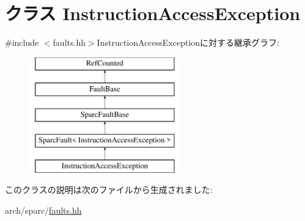 \hypertarget{classSparcISA_1_1InstructionAccessException}{
\section{クラス InstructionAccessException}
\label{classSparcISA_1_1InstructionAccessException}
}


{\ttfamily \#include $<$faults.hh$>$}InstructionAccessExceptionに対する継承グラフ:\begin{figure}[H]
\begin{center}
\leavevmode
\includegraphics[height=5cm]{classSparcISA_1_1InstructionAccessException}
\end{center}
\end{figure}


このクラスの説明は次のファイルから生成されました:\begin{DoxyCompactItemize}
\item 
arch/sparc/\hyperlink{arch_2sparc_2faults_8hh}{faults.hh}\end{DoxyCompactItemize}
